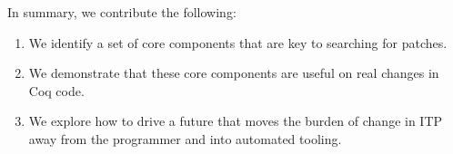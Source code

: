 In summary, we contribute the following:

\begin{enumerate}
\item We identify a set of core components that are key to searching for patches.
\item We demonstrate that these core components are useful on real changes in Coq code.
\item We explore how to drive a future that moves the burden of change in ITP away from the programmer and into automated tooling.
\end{enumerate}







